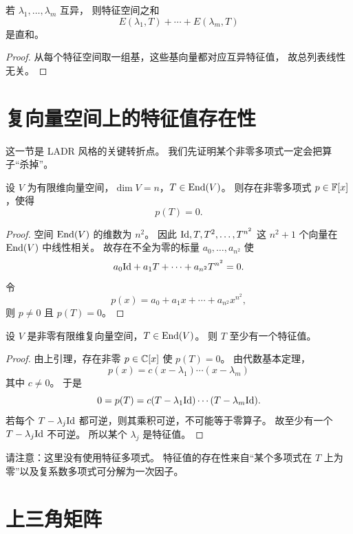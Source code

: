 \begin{corollary}
若 $\lambda_1,\dots,\lambda_m$ 互异，
则特征空间之和
\[
E(\lambda_1,T)+\cdots+E(\lambda_m,T)
\]
是直和。
\end{corollary}

\begin{proof}
从每个特征空间取一组基，这些基向量都对应互异特征值，
故总列表线性无关。
\end{proof}

\section{复向量空间上的特征值存在性}

这一节是 LADR 风格的关键转折点。
我们先证明某个非零多项式一定会把算子“杀掉”。

\begin{lemma}
设 $V$ 为有限维向量空间，$\dim V=n$，$T\in\mathrm{End}(V)$。
则存在非零多项式 $p\in\mathbb{F}[x]$，使得
\[
p(T)=0.
\]
\end{lemma}

\begin{proof}
空间 $\mathrm{End}(V)$ 的维数为 $n^2$。
因此 $\mathrm{Id},T,T^2,\dots,T^{n^2}$ 这 $n^2+1$ 个向量在 $\mathrm{End}(V)$ 中线性相关。
故存在不全为零的标量 $a_0,\dots,a_{n^2}$ 使
\[
a_0\mathrm{Id}+a_1T+\cdots+a_{n^2}T^{n^2}=0.
\]
令
\[
p(x)=a_0+a_1x+\cdots+a_{n^2}x^{n^2},
\]
则 $p\neq 0$ 且 $p(T)=0$。
\end{proof}

\begin{theorem}
设 $V$ 是非零有限维复向量空间，$T\in\mathrm{End}(V)$。
则 $T$ 至少有一个特征值。
\end{theorem}

\begin{proof}
由上引理，存在非零 $p\in\mathbb{C}[x]$ 使 $p(T)=0$。
由代数基本定理，
\[
p(x)=c(x-\lambda_1)\cdots(x-\lambda_m)
\]
其中 $c\neq 0$。
于是
\[
0=p(T)=c(T-\lambda_1\mathrm{Id})\cdots(T-\lambda_m\mathrm{Id}).
\]
若每个 $T-\lambda_j\mathrm{Id}$ 都可逆，则其乘积可逆，不可能等于零算子。
故至少有一个 $T-\lambda_j\mathrm{Id}$ 不可逆。
所以某个 $\lambda_j$ 是特征值。
\end{proof}

\begin{remark}
请注意：这里没有使用特征多项式。
特征值的存在性来自“某个多项式在 $T$ 上为零”以及复系数多项式可分解为一次因子。
\end{remark}

\section{上三角矩阵}

